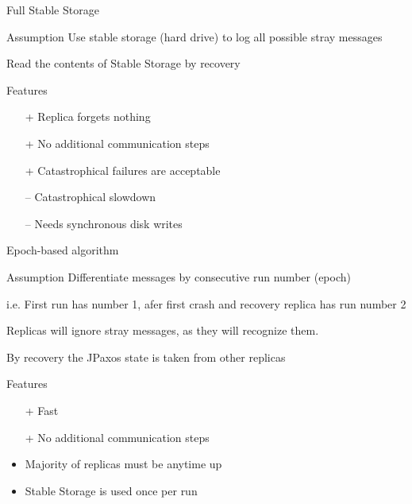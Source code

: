 \documentclass[hyperref={pdfpagelabels=true},11pt,compress,trans]{beamer}
\begin{document}
\begin{frame}{Full Stable Storage}
 \begin{block}{Assumption}
  Use stable storage (hard drive) to log all possible stray messages
  
  Read the contents of Stable Storage by recovery
 \end{block}

 \begin{block}{Features}
  \vspace{-1em}\vspace{-\parskip}\vspace{-\lineskip}
  \begin{itemize}
   \item[+]  Replica forgets nothing
   \item[+]  No additional communication steps
   \item[+]  Catastrophical failures are acceptable
   \item[--] Catastrophical slowdown
   \item[--] Needs synchronous disk writes
  \end{itemize}
 \end{block}
\end{frame}

\begin{frame}{Epoch-based algorithm}
 \begin{block}{Assumption}
  Differentiate messages by consecutive run number (epoch)

{\footnotesize i.e. First run has number 1, afer first crash and recovery replica has run number 2}

  Replicas will ignore stray messages, as they will recognize them.

  By recovery the JPaxos state is taken from other replicas
 \end{block}
 \begin{block}{Features}
  \vspace{-1em}\vspace{-\parskip}\vspace{-\lineskip}
  \begin{itemize}
   \item[+]  Fast
   \item[+]  No additional communication steps
   \item     Majority of replicas must be anytime up
   \item     Stable Storage is used once per run
  \end{itemize}
 \end{block}
\end{frame}
\end{document}

